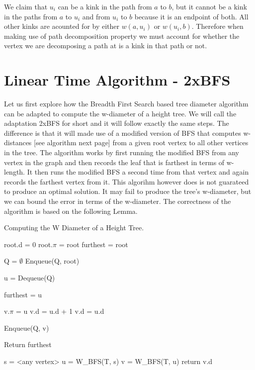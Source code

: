 We claim that $u_i$ can be a kink in the path from $a$ to $b$, but it cannot be a kink in the paths from $a$ to $u_i$ and from $u_i$ to $b$ because it is an endpoint of both. All other kinks are acounted for by either $w(a, u_i)$ or $w(u_i, b)$. Therefore when making use of path decomposition property we must account for whether the vertex we are decomposing a path at is a kink in that path or not.


\section{Linear Time Algorithm - 2xBFS}

Let us first explore how the Breadth First Search based tree diameter algorithm can be adapted to compute the w-diameter of a height tree. We will call the adaptation 2xBFS for short and it will follow exactly the same steps. The difference is that it will made use of a modified version of BFS that computes w-distances [see algorithm next page] from a given root vertex to all other vertices in the tree. The algorithm works by first running the modified BFS from any vertex in the graph and then records the leaf that is farthest in terms of w-length. It then runs the modified BFS a second time from that vertex and again records the farthest vertex from it. This algorihm however does is not guarateed to produce an optimal solution. It may fail to produce the tree's w-diameter, but we can bound the error in terms of the w-diameter. The correctness of the algorithm is based on the following Lemma.

\begin{algorithm}
\caption{Computing the W Diameter of a Height Tree.}

\begin{algorithmic}[1]

    \State root.d = 0
    \State root.$\pi$ = root
    \State furthest = root

    \State Q = $\emptyset$
    \State Enqueue(Q, root)

        \State u = Dequeue(Q)

            \State furthest = u
        \EndIf

                \State v.$\pi$ = u
                    \State v.d = u.d + 1
                \Else
                    \State v.d = u.d
                \EndIf

                \State Enqueue(Q, v)

            \EndIf
        \EndFor
    \EndWhile
    \State Return furthest
\EndFunction

    \State s = <any vertex>
    \State u = W\_BFS(T, s)
    \State v = W\_BFS(T, u)
    \State return v.d
\EndFunction

\end{algorithmic}
\end{algorithm}



